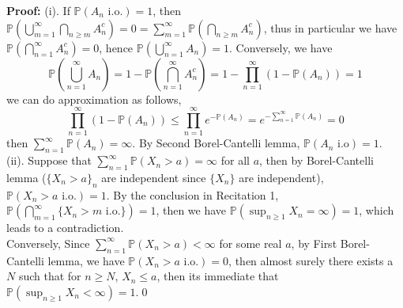 \documentclass[12pt]{article}
\begin{document}
\textbf{Proof:} (i). If $\mathbb{P}(A_n\text{ i.o.})=1$, then $\mathbb{P}\left(\bigcup\limits_{m=1}^\infty\bigcap\limits_{n\geq m}A_n^c\right)=0=\sum\limits_{m=1}^\infty\mathbb{P}\left(\bigcap\limits_{n\geq m}A_n^c\right)$, thus in particular we have $\mathbb{P}\left(\bigcap\limits_{n=1}^\infty A_{n}^c\right)=0$, hence $\mathbb{P}\left(\bigcup\limits_{n=1}^\infty A_n\right)=1$. Conversely, we have 
$$
    \mathbb{P}\left(\bigcup_{n=1}^\infty A_n\right)=1-\mathbb{P}\left(\bigcap_{n=1}^\infty A_n^c\right)=1-\prod\limits_{n=1}^\infty (1-\mathbb{P}(A_n))=1
$$
we can do approximation as follows, 
$$
    \prod\limits_{n=1}^\infty (1-\mathbb{P}(A_n))\leq \prod\limits_{n=1}^\infty e^{-\mathbb{P}(A_n)}=e^{-\sum\limits_{n=1}^\infty\mathbb{P}(A_n)}=0
$$
then $\sum\limits_{n=1}^\infty\mathbb{P}(A_n)=\infty$. By Second Borel-Cantelli lemma, $\mathbb{P}(A_n\text{ i.o})=1$. \\
\indent (ii). Suppose that $\sum\limits_{n=1}^\infty\mathbb{P}(X_n>a)=\infty$ for all $a$, then by Borel-Cantelli lemma ($\{X_n>a\}_n$ are independent since $\{X_n\}$ are independent), $\mathbb{P}(X_n>a\text{ i.o.})=1$. By the conclusion in Recitation 1, $\mathbb{P}\left(\bigcap\limits_{m=1}^\infty \{X_n>m\text{ i.o.}\}\right)=1$, then we have $\mathbb{P}(\sup_{n\geq 1} X_n=\infty)=1$, which leads to a contradiction. \\
\indent Conversely, Since $\sum\limits_{n=1}^\infty\mathbb{P}(X_n>a)<\infty$ for some real $a$, by First Borel-Cantelli lemma, we have $\mathbb{P}(X_n>a\text{ i.o.})=0$, then almost surely there exists a $N$ such that for $n\geq N$, $X_n\leq a$, then its immediate that  $\mathbb{P}\left(\sup_{n\geq 1}X_n<\infty\right)=1$.\qed 
\end{document}
